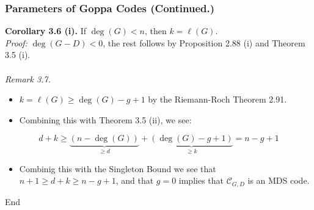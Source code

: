 \documentclass[10pt]{beamer}
\begin{document}
\begin{frame}
  \frametitle{Parameters of Goppa Codes (Continued.)}
  \textbf{Corollary 3.6 (i).} If $\deg(G) < n$, then $k = \ell(G)$. \\
  \pause
  \textit{Proof:} $\deg(G - D) < 0$, the rest follows by Proposition 2.88 (i) and Theorem 3.5 (i). \\ \; \\
  \pause
  \textit{Remark 3.7.}
  \begin{itemize}
    \item $k = \ell(G) \geq \deg(G) - g + 1$ by the Riemann-Roch Theorem 2.91.
  \pause
    \item Combining this with Theorem 3.5 (ii), we see:
  \end{itemize}
      \begin{equation}\label{eq:1}
        d + k \geq \underbrace{(n - \deg(G))}_{\geq d} + \underbrace{(\deg(G) - g + 1)}_{\geq k} = n - g + 1
      \end{equation}
  \begin{itemize}
  \pause
    \item Combinig this with the Singleton Bound we see that $n + 1 \geq d + k \geq n - g + 1$, and that $g = 0$ implies that $\mathcal{C}_{G, D}$ is an MDS code.
  \end{itemize}
\end{frame}

%
%




\begin{frame}{End}
\end{frame}
\end{document}
